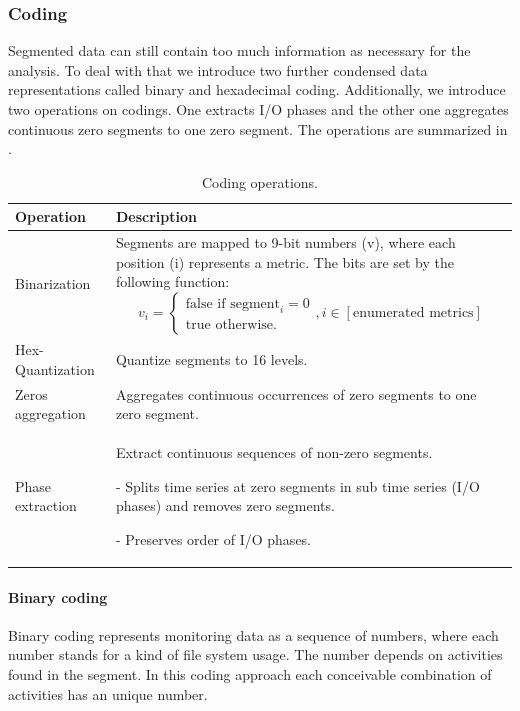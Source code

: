 \documentclass[]{llncs}
\begin{document}
\subsubsection{Coding}
Segmented data can still contain too much information as necessary for the analysis.
To deal with that we introduce two further condensed data representations called binary and hexadecimal coding.
Additionally, we introduce two operations on codings.
One extracts I/O phases and the other one aggregates continuous zero segments to one zero segment.
The operations are summarized in .

\begin{table}
 \centering
 \begin{tabularx}{\textwidth}{lX}
	 Operation &  Description \\
	 \hline
	 Binarization & Segments are mapped to 9-bit numbers (v), where each position (i) represents a metric. The bits are set by the following function:
	 \vbox{
		\begin{equation}
			v_i = 
			\begin{cases}
				\text{false if segment}_i = 0\\\text{true otherwise.}
			\end{cases}, i \in [\text{enumerated metrics}]
		\end{equation}
	 } \\
	 \hline
	 Hex-Quantization & Quantize segments to 16 levels. \\
	 \hline
	 Zeros aggregation & Aggregates continuous occurrences of zero segments to one zero segment. \\
	 \hline
	 Phase extraction &  Extract continuous sequences of non-zero segments. \par - Splits time series at zero segments in sub time series (I/O phases) and removes zero segments. \par - Preserves order of I/O phases. \\
	 \hline
 \end{tabularx}
 \caption{Coding operations.}
 \label{tab:coding_ops}
\end{table}
\paragraph{Binary coding}
Binary coding represents monitoring data as a sequence of numbers, where each number stands for a kind of file system usage.
The number depends on activities found in the segment.
In this coding approach each conceivable combination of activities has an unique number.
\end{document}
